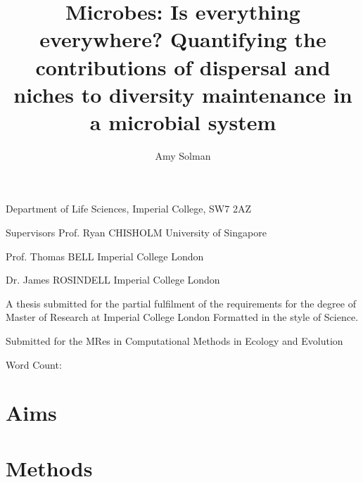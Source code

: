 \documentclass{article}
\begin{document}
\title{Microbes: Is everything everywhere? Quantifying the contributions of dispersal and niches to diversity maintenance in a microbial system}

\author{Amy Solman}

\maketitle

Department of Life Sciences, Imperial College, SW7 2AZ

Supervisors
Prof. Ryan CHISHOLM
University of Singapore

Prof. Thomas BELL
Imperial College London

Dr. James ROSINDELL
Imperial College London

A thesis submitted for the partial fulfilment of the requirements for the degree of Master of Research at Imperial College London
Formatted in the style of Science.

Submitted for the MRes in Computational Methods in Ecology and Evolution

Word Count: 

\newpage

\section{Aims}

\section{Methods}
  
\end{document}
